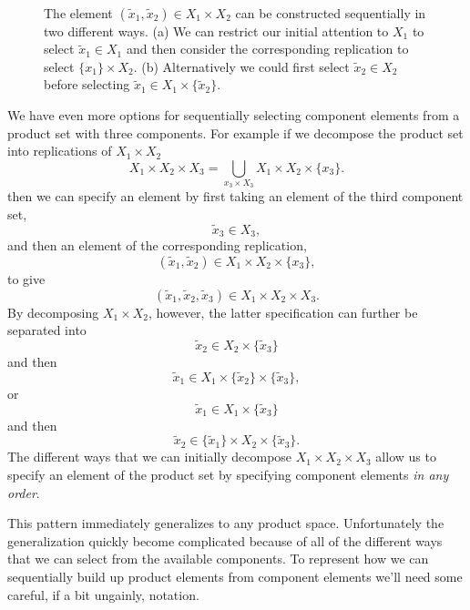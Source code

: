 \documentclass[
  letterpaper,
  DIV=11,
  numbers=noendperiod]{scrartcl}
\begin{document}
\begin{figure}
\begin{minipage}[t]{0.90\linewidth}
{{}

}

\subcaption{\label{fig-sequential-selection21}}
\end{minipage}%
%
\begin{minipage}[t]{0.05\linewidth}

{\centering 

~

}

\end{minipage}%

\caption{\label{fig-sequential-selection}The element
\((\tilde{x}_{1}, \tilde{x}_{2}) \in X_{1} \times X_{2}\) can be
constructed sequentially in two different ways. (a) We can restrict our
initial attention to \(X_{1}\) to select \(\tilde{x}_{1} \in X_{1}\) and
then consider the corresponding replication to select
\(\{ x_{1} \} \times X_{2}\). (b) Alternatively we could first select
\(\tilde{x}_{2} \in X_{2}\) before selecting
\(\tilde{x}_{1} \in X_{1} \times \{ \tilde{x}_{2} \}\).}

\end{figure}

We have even more options for sequentially selecting component elements
from a product set with three components. For example if we decompose
the product set into replications of \(X_{1} \times X_{2}\) \[
X_{1} \times X_{2} \times X_{3}
=
\bigcup_{ x_{3} \times X_{3} } X_{1} \times X_{2} \times \{ x_{3} \}.
\] then we can specify an element by first taking an element of the
third component set, \[
\tilde{x}_{3} \in X_{3},
\] and then an element of the corresponding replication, \[
(\tilde{x}_{1}, \tilde{x}_{2}) \in X_{1} \times X_{2} \times \{ x_{3} \},
\] to give \[
(\tilde{x}_{1}, \tilde{x}_{2}, \tilde{x}_{3}) \in X_{1} \times X_{2} \times X_{3}.
\] By decomposing \(X_{1} \times X_{2}\), however, the latter
specification can further be separated into \[
\tilde{x}_{2} \in X_{2} \times \{ \tilde{x}_{3} \}
\] and then \[
\tilde{x}_{1} \in X_{1} \times \{ \tilde{x}_{2} \} \times \{ \tilde{x}_{3} \},
\] or \[
\tilde{x}_{1} \in X_{1} \times \{ \tilde{x}_{3} \}
\] and then \[
\tilde{x}_{2} \in \{ \tilde{x}_{1} \} \times X_{2} \times \{ \tilde{x}_{3} \}.
\] The different ways that we can initially decompose
\(X_{1} \times X_{2} \times X_{3}\) allow us to specify an element of
the product set by specifying component elements \emph{in any order}.

This pattern immediately generalizes to any product space. Unfortunately
the generalization quickly become complicated because of all of the
different ways that we can select from the available components. To
represent how we can sequentially build up product elements from
component elements we'll need some careful, if a bit ungainly, notation.
\end{document}
